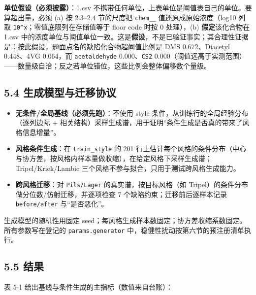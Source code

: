 \documentclass[
  11pt,
]{ctexart}
\providecommand{\tightlist}{%
  \setlength{\itemsep}{0pt}\setlength{\parskip}{0pt}}
\begin{document}
\textbf{单位假设（必须披露）}：1.csv
不携带任何单位，上表单位是阈值表自己的单位。要算超出量，必须 (a) 按
2.3--2.4 节的尺度把 \texttt{chem\_\_} 值还原成原始浓度（log10 列取
\texttt{10\^{}x}；零值底限列在存储值等于 floor code 时按 0 处理），(b)
\textbf{假定}该化合物在 1.csv
中的浓度单位与阈值单位一致。这是\textbf{假设}，不是已验证事实；其合理性证据是：按此假设，题面点名的缺陷化合物超阈值比例是
DMS 0.672、Diacetyl 0.448、4VG 0.064，而 \texttt{acetaldehyde}
0.000、\texttt{CS2}
0.000（阈值远高于实测范围）------数量级自洽；反之若单位错位，这些比例会整体偏移数个量级。

\subsection{5.4
生成模型与迁移协议}\label{ux751fux6210ux6a21ux578bux4e0eux8fc1ux79fbux534fux8bae}

\begin{itemize}
\tightlist
\item
  \textbf{无条件/全局基线（必须先跑）}：不使用 style
  条件，从训练行的全局经验分布（逐列边际 +
  相关结构）采样生成谱，用于证明``条件生成是否真的带来了风格信息增量''。
\item
  \textbf{风格条件生成}：在 \texttt{train\_style} 的 201
  行上估计每个风格的条件分布（中心与协方差，按风格内样本量做收缩），在给定风格下采样生成谱；Tripel/Kriek/Lambic
  三个风格不参与拟合，只用于测试跨风格生成能力。
\item
  \textbf{跨风格迁移}：对 \texttt{Pils/Lager} 的真实谱，按目标风格（如
  Tripel）的条件分布做分位数/仿射迁移，并逐项检查 7
  个缺陷约束；迁移前后逐样本记录 \texttt{before/after} 与``是否恶化''。
\end{itemize}

生成模型的随机性用固定
seed；每风格生成样本数固定；协方差收缩系数固定。所有参数写在登记的
\texttt{params.\allowbreak{}generator} 中，稳健性扰动按第六节的预注册清单执行。

\subsection{5.5 结果}\label{ux7ed3ux679c-1}

表 5-1 给出基线与条件生成的主指标（数值来自台账）：
\end{document}
